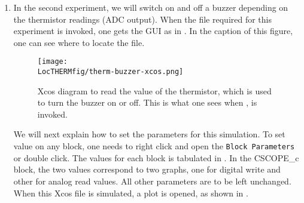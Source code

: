 \begin{enumerate}
  \item In the second experiment, we will switch on and off a buzzer
        depending on the thermistor readings (ADC output).
        When the file required for this
        experiment is invoked, one gets the GUI as in .
        In the caption of this figure, one can see where to locate the file.

        \begin{figure}
          \centering
          \texttt{[image: \\LocTHERMfig/therm-buzzer-xcos.png]}
          \caption[Xcos diagram to read the value of thermistor, which is
            used to turn the buzzer on or off] {Xcos diagram to read the value
            of the thermistor, which is used to turn the buzzer on or off.
            This is what one sees when
            , is invoked.}
          \label{fig:therm-buzzer}
        \end{figure}

        We will next explain how to set the parameters for this simulation.
        To set value on any block, one needs to right click and open the
          {\tt Block Parameters} or double click.  The values for each block
        is tabulated in .  In the CSCOPE\_c block, the
        two values correspond to two graphs, one for digital write and other
        for analog read values. All other parameters are to be left
        unchanged. When this Xcos file is simulated, a plot is opened,
        as shown in .


\end{enumerate}
